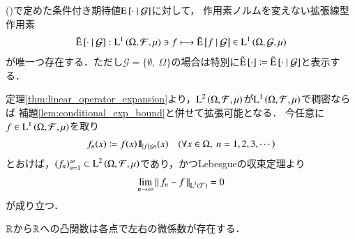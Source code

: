 	\begin{screen}
		\begin{thm}[条件付き期待値作用素の拡張]
			()で定めた条件付き期待値$\operatorname{E} \left[ \cdot \ \middle|\ \mathcal{G} \right]$に対して，
			作用素ノルムを変えない拡張線型作用素
			\begin{align}
				\tilde{\operatorname{E}} \left[ \cdot \ \middle|\ \mathcal{G} \right]:\operatorname{L}^{1} \left(\Omega,\mathcal{F},\mu\right) \ni f \longmapsto \tilde{\operatorname{E}} \left[ f \ \middle|\ \mathcal{G} \right] \in \operatorname{L}^{1} \left(\Omega,\mathcal{G},\mu\right)
			\end{align}
			が唯一つ存在する．ただし$\mathcal{G} = \{\emptyset,\ \Omega\}$の場合は特別に$\tilde{\operatorname{E}} \left[ \cdot \right] \coloneqq \tilde{\operatorname{E}} \left[ \cdot \ \middle|\ \mathcal{G} \right]$と表示する．
			\label{thm:conditional_exp_expansion}
		\end{thm}
	\end{screen}
	
	\begin{prf}	
		定理\ref{thm:linear_operator_expansion}より，$\operatorname{L}^{2} \left(\Omega,\mathcal{F},\mu\right)$が$\operatorname{L}^{1} \left(\Omega,\mathcal{F},\mu\right)$で稠密ならば
		補題\ref{lem:conditional_exp_bound}と併せて拡張可能となる．
		今任意に$f \in \operatorname{L}^{1} \left(\Omega,\mathcal{F},\mu\right)$を取り
		\begin{align}
			f_n(x) \coloneqq f(x) \mbox{1}\hspace{-0.25em}\mbox{l}_{|f| \leq n} (x) \quad (\forall x \in \Omega,\ n=1,2,3,\cdots) \label{conditional_exp_expansion}
		\end{align}
		とおけば，$(f_n)_{n=1}^{\infty} \subset \operatorname{L}^{2} \left(\Omega,\mathcal{F},\mu\right)$であり，かつLebesgueの収束定理より
		\begin{align}
			\lim_{n \to \infty} \left\|\, f_n - f\, \right\|_{\operatorname{L}^{1} \left(\mathcal{F}\right)} = 0
		\end{align}
		が成り立つ．
		\QED
	\end{prf}
	
	\begin{screen}
		\begin{lem}[凸関数は片側微分可能]
			$\mathbb{R}$から$\mathbb{R}$への凸関数は各点で左右の微係数が存在する．
			\label{lem:convex_function_measurability}
		\end{lem}
	\end{screen}
	
